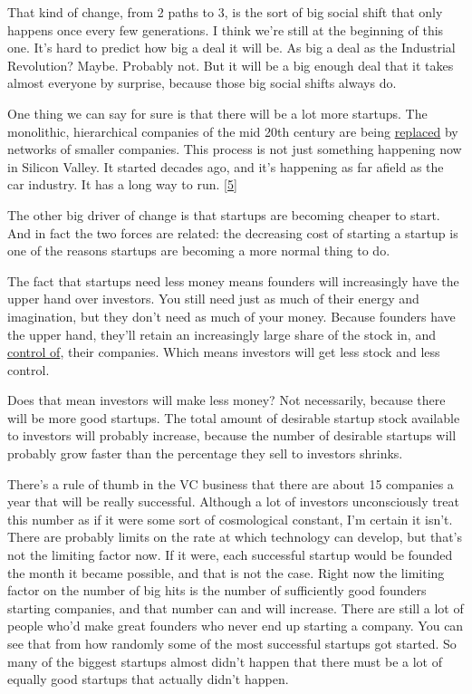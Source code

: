 That kind of change, from 2 paths to 3, is the sort of big social shift
that only happens once every few generations. I think we're still at the
beginning of this one. It's hard to predict how big a deal it will be.
As big a deal as the Industrial Revolution? Maybe. Probably not. But it
will be a big enough deal that it takes almost everyone by surprise,
because those big social shifts always do.

One thing we can say for sure is that there will be a lot more startups.
The monolithic, hierarchical companies of the mid 20th century are being
\href{highres.html}{replaced} by networks of smaller companies. This
process is not just something happening now in Silicon Valley. It
started decades ago, and it's happening as far afield as the car
industry. It has a long way to run. {[}\hyperref[f5n]{5}{]}

The other big driver of change is that startups are becoming cheaper to
start. And in fact the two forces are related: the decreasing cost of
starting a startup is one of the reasons startups are becoming a more
normal thing to do.

The fact that startups need less money means founders will increasingly
have the upper hand over investors. You still need just as much of their
energy and imagination, but they don't need as much of your money.
Because founders have the upper hand, they'll retain an increasingly
large share of the stock in, and \href{control.html}{control of}, their
companies. Which means investors will get less stock and less control.

Does that mean investors will make less money? Not necessarily, because
there will be more good startups. The total amount of desirable startup
stock available to investors will probably increase, because the number
of desirable startups will probably grow faster than the percentage they
sell to investors shrinks.

There's a rule of thumb in the VC business that there are about 15
companies a year that will be really successful. Although a lot of
investors unconsciously treat this number as if it were some sort of
cosmological constant, I'm certain it isn't. There are probably limits
on the rate at which technology can develop, but that's not the limiting
factor now. If it were, each successful startup would be founded the
month it became possible, and that is not the case. Right now the
limiting factor on the number of big hits is the number of sufficiently
good founders starting companies, and that number can and will increase.
There are still a lot of people who'd make great founders who never end
up starting a company. You can see that from how randomly some of the
most successful startups got started. So many of the biggest startups
almost didn't happen that there must be a lot of equally good startups
that actually didn't happen.

